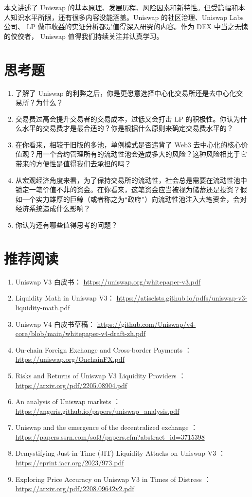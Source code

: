 \documentclass[12pt, a4paper, oneside]{ctexart}
\begin{document}
本文讲述了 Uniswap 的基本原理、发展历程、风险因素和新特性。但受篇幅和本人知识水平所限，还有很多内容没能涵盖。Uniswap 的社区治理、Uniswap Labs 公司、 LP 做市收益的实证分析都是值得深入研究的内容。作为 DEX 中当之无愧的佼佼者， Uniswap 值得我们持续关注并认真学习。

\section*{思考题}
\markboth{}{}

\begin{enumerate}
    \item 了解了 Uniswap 的利弊之后，你是更愿意选择中心化交易所还是去中心化交易所？为什么？
    \item 交易费过高会提升交易者的交易成本，过低又会打击 LP 的积极性。你认为什么水平的交易费才是最合适的？你是根据什么原则来确定交易费水平的？
    \item 在你看来，相较于旧版的多池，单例模式是否违背了 Web3 去中心化的核心价值观？用一个合约管理所有的流动性池会造成多大的风险？这种风险相比于它带来的方便性是值得我们去承担的吗？
    \item 从宏观经济角度来看，为了保持交易所的流动性，社会总是需要在流动性池中锁定一笔价值不菲的资金。在你看来，这笔资金应当被视为储蓄还是投资？假如一个实力雄厚的巨鲸（或者称之为“政府”）向流动性池注入大笔资金，会对经济系统造成什么影响？
    \item 你认为还有哪些值得思考的问题？
\end{enumerate}

\section*{推荐阅读}

\begin{enumerate}
    \item Uniswap V3 白皮书： \url{https://uniswap.org/whitepaper-v3.pdf}
    \item Liquidity Math in Uniswap V3： \url{https://atiselsts.github.io/pdfs/uniswap-v3-liquidity-math.pdf}
    \item Uniswap V4 白皮书草稿： \url{https://github.com/Uniswap/v4-core/blob/main/whitepaper-v4-draft-zh.pdf}
    \item On-chain Foreign Exchange and Cross-border Payments ： \url{https://uniswap.org/OnchainFX.pdf}
    \item Risks and Returns of Uniswap V3 Liquidity Providers ： \url{https://arxiv.org/pdf/2205.08904.pdf}
    \item An analysis of Uniswap markets ： \url{https://angeris.github.io/papers/uniswap_analysis.pdf}
    \item Uniswap and the emergence of the decentralized exchange ： \url{https://papers.ssrn.com/sol3/papers.cfm?abstract_id=3715398}
    \item Demystifying Just-in-Time (JIT) Liquidity Attacks on Uniswap V3 ： \url{https://eprint.iacr.org/2023/973.pdf}
    \item Exploring Price Accuracy on Uniswap V3 in Times of Distress ： \url{https://arxiv.org/pdf/2208.09642v2.pdf}
\end{enumerate}
\end{document}
